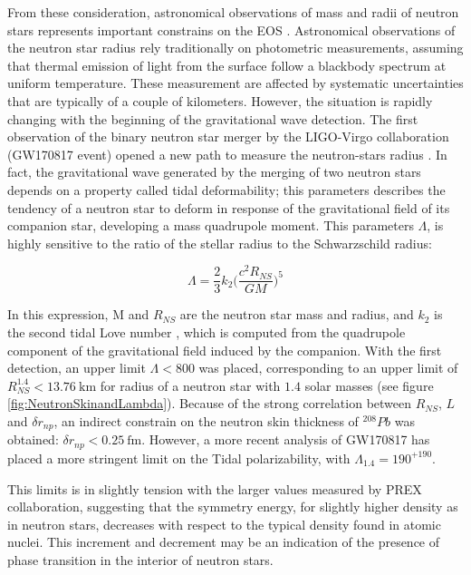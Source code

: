 From these consideration, astronomical observations of mass and radii of neutron stars represents important constrains on the EOS .
Astronomical observations of the neutron star radius rely traditionally on photometric measurements, assuming that thermal emission of light from the surface follow a blackbody spectrum at uniform temperature. These measurement are affected by systematic uncertainties that are typically of a couple of kilometers.
However, the situation is rapidly changing with the beginning of the gravitational wave detection. The first observation of the binary neutron star merger by the LIGO-Virgo collaboration (GW170817 event) opened a new path to measure the neutron-stars radius \cite{LIGOScientific:2017vwq}. In fact, the gravitational wave generated by the merging of two neutron stars depends on a property called tidal deformability; this parameters describes the tendency of a neutron star to deform in response of the gravitational field of its companion star, developing a mass quadrupole moment. This parameters $\Lambda$, is highly sensitive to the ratio of the stellar radius to the Schwarzschild radius:

\begin{equation}
\Lambda = \frac{2}{3} k_{2} \big( \dfrac{c^{2} R_{NS}}{GM} \big)^{5}
\end{equation}

In this expression, M and $R_{NS}$ are the neutron star mass and radius, and $k_{2}$ is the second tidal Love number \cite{Binnington:2009bb}, which is computed from the quadrupole component of the gravitational field induced by the companion. With the first detection, an upper limit $\Lambda < 800$ was placed, corresponding to an upper limit of $R_{NS}^{1.4} < \SI{13.76}{\kilo \meter}$ \cite{Fattoyev_2018} for radius of a neutron star with $1.4$ solar masses (see figure \ref{fig:NeutronSkinandLambda}). Because of the strong correlation between $R_{NS}$, $L$ and $\delta r_{np}$, an indirect constrain on the neutron skin thickness of $^{208}Pb$ was obtained: $\delta r_{np} < \SI{0.25}{\femto \meter}$. However, a more recent analysis \cite{LIGOScientific:2018cki} of GW170817 has placed a more stringent limit on the Tidal polarizability, with $\Lambda_{1.4} = 190^{+190}$.

 This limits is in slightly tension with the larger values measured by PREX collaboration, suggesting that the symmetry energy, for slightly higher density as in neutron stars, decreases with respect to the typical density found in atomic nuclei. This increment and decrement may be an indication of the presence of phase transition in the interior of neutron stars.

